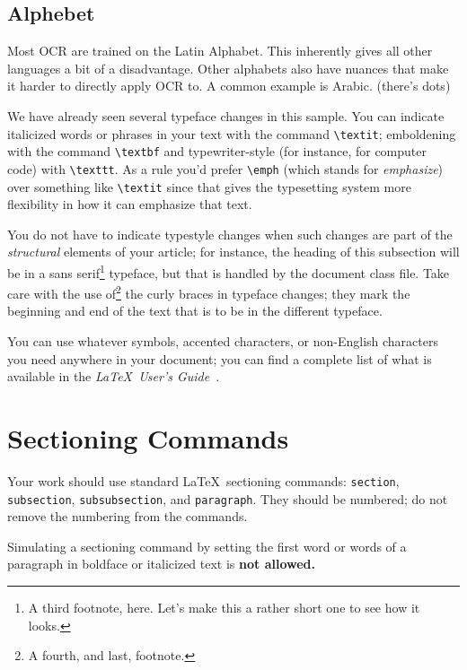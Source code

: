 \documentclass[sigplan,screen,nonacm]{acmart}
\begin{document}
\subsection{Alphebet}
\label{sec:Alphabet}

Most OCR are trained on the Latin Alphabet. This inherently gives all other languages a bit of a disadvantage. Other alphabets also have nuances that make it harder to directly apply OCR to. A common example is Arabic. (there's dots)  

We have already seen several typeface changes in this sample.  You
can indicate italicized words or phrases in your text with
the command \texttt{\textbackslash textit}; emboldening with the
command \texttt{\textbackslash textbf}
and typewriter-style (for instance, for computer code) with
\texttt{\textbackslash texttt}.
As a rule you'd prefer \texttt{\textbackslash emph} (which stands for \emph{emphasize})
over something like \texttt{\textbackslash textit} since that gives the typesetting system
more flexibility in how it can emphasize that text.

You do not
have to indicate typestyle changes when such changes are
part of the \textit{structural} elements of your
article; for instance, the heading of this subsection will
be in a sans serif\footnote{A third footnote, here.
Let's make this a rather short one to
see how it looks.} typeface, but that is handled by the
document class file. Take care with the use
of\footnote{A fourth, and last, footnote.}
the curly braces in typeface changes; they mark
the beginning and end of
the text that is to be in the different typeface.

You can use whatever symbols, accented characters, or
non-English characters you need anywhere in your document;
you can find a complete list of what is
available in the \textit{\LaTeX\
User's Guide}~\cite{Lamport:LaTeX}.


\section{Sectioning Commands}

Your work should use standard \LaTeX\ sectioning commands:
\verb|section|, \verb|subsection|, \verb|subsubsection|, and
\verb|paragraph|. They should be numbered; do not remove the numbering
from the commands.

Simulating a sectioning command by setting the first word or words of
a paragraph in boldface or italicized text is {\bfseries not allowed.}
\end{document}
